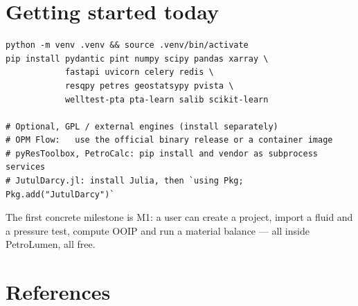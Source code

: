 \documentclass[11pt,a4paper]{article}
\begin{document}
\section{Getting started today}

\begin{lstlisting}[style=sh, caption={Bootstrap environment for the reservoir module.}]
python -m venv .venv && source .venv/bin/activate
pip install pydantic pint numpy scipy pandas xarray \
            fastapi uvicorn celery redis \
            resqpy petres geostatsypy pvista \
            welltest-pta pta-learn salib scikit-learn

# Optional, GPL / external engines (install separately)
# OPM Flow:   use the official binary release or a container image
# pyResToolbox, PetroCalc: pip install and vendor as subprocess services
# JutulDarcy.jl: install Julia, then `using Pkg; Pkg.add("JutulDarcy")`
\end{lstlisting}

\noindent The first concrete milestone is M1: a user can create a project,
import a fluid and a pressure test, compute OOIP and run a material balance ---
all inside PetroLumen, all free.

\section*{References}
\end{document}
